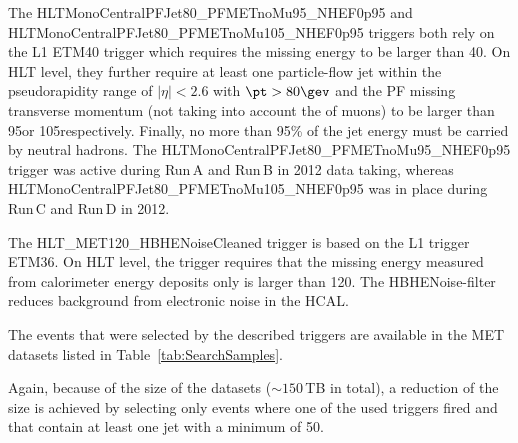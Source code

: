 The HLTMonoCentralPFJet80\_PFMETnoMu95\_NHEF0p95 and HLTMonoCentralPFJet80\_PFMETnoMu105\_NHEF0p95 triggers both rely on the L1 ETM40 trigger which requires the missing energy to be larger than 40\gev.
On HLT level, they further require at least one particle-flow jet within the pseudorapidity range of $|\eta|<2.6$ with $\pt>80\gev$ and the PF missing transverse momentum (not taking into account the \pt of muons) to be larger than 95\gev or 105\gev respectively.
Finally, no more than 95\% of the jet energy must be carried by neutral hadrons.
The HLTMonoCentralPFJet80\_PFMETnoMu95\_NHEF0p95 trigger was active during Run\,A and Run\,B in 2012 data taking, whereas HLTMonoCentralPFJet80\_PFMETnoMu105\_NHEF0p95 was in place during Run\,C and Run\,D in 2012.

The HLT\_MET120\_HBHENoiseCleaned trigger is based on the L1 trigger ETM36. %
On HLT level, the trigger requires that the missing energy measured from calorimeter energy deposits only is larger than 120\gev.
The HBHENoise-filter reduces background from electronic noise in the HCAL.

The events that were selected by the described triggers are available in the MET datasets listed in Table~\ref{tab:SearchSamples}.
\renewcommand{\arraystretch}{1.5}
\begin{table}[!hbt]
\centering
\caption{MET data samples used in the search with the contained integrated luminosity.}
\label{tab:SearchSamples}
\end{table}  
Again, because of the size of the datasets ($\sim150\,$TB in total), a reduction of the size is achieved by selecting only events where one of the used triggers fired and that contain at least one jet with a minimum \pt of 50\gev.\\


